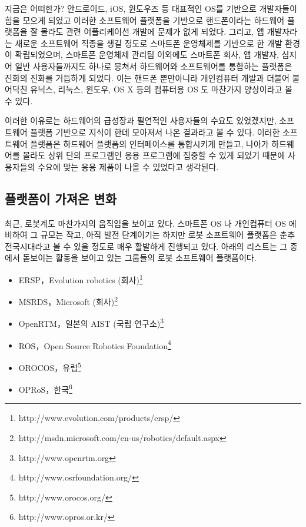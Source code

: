 지금은 어떠한가?
안드로이드, iOS, 윈도우즈 등 대표적인 OS를 기반으로 개발자들이 힘을 모으게 되었고 이러한 소프트웨어 플랫폼을 기반으로 핸드폰이라는 하드웨어 플랫폼을 잘 몰라도 관련 어플리케이션 개발에 문제가 없게 되었다.
그리고, 앱 개발자라는 새로운 소프트웨어 직종을 생길 정도로 스마트폰 운영체제를 기반으로 한 개발 환경이 확립되었으며, 스마트폰 운영체제 관리팀 이외에도 스마트폰 회사, 앱 개발자, 심지어 일반 사용자들까지도 하나로 뭉쳐서 하드웨어와 소프트웨어를 통합하는 플랫폼은 진화의 진화를 거듭하게 되었다.
이는 핸드폰 뿐만아니라 개인컴퓨터 개발과 더불어 불어닥친 유닉스, 리눅스, 윈도우, OS X 등의 컴퓨터용 OS 도 마찬가지 양상이라고 볼 수 있다.

이러한 이유로는 하드웨어의 급성장과 필연적인 사용자들의 수요도 있었겠지만,  소프트웨어 플랫폼 기반으로 지식이 한데 모아져서 나온 결과라고 볼 수 있다.
이러한 소프트웨어 플랫폼은 하드웨어 플랫폼의 인터페이스를 통합시키게 만들고, 나아가 하드웨어를 몰라도 상위 단의 프로그램인 응용 프로그램에 집중할 수 있게 되었기 때문에 사용자들의 수요에 맞는 응용 제품이 나올 수 있었다고 생각된다. 

\subsection{플랫폼이 가져온 변화}

최근, 로봇계도 마찬가지의 움직임을 보이고 있다. 스마트폰 OS 나 개인컴퓨터 OS 에 비하여 그 규모는 작고, 아직 발전 단계이기는 하지만 로봇 소프트웨어 플랫폼은 춘추전국시대라고 볼 수 있을 정도로 매우 활발하게 진행되고 있다.
아래의 리스트는 그 중에서 돋보이는 활동을 보이고 있는 그룹들의 로봇 소프트웨어 플랫폼이다.

\begin{itemize}
\item ERSP，Evolution robotics (회사)\footnote{http://www.evolution.com/products/ersp/}
\item MSRDS，Microsoft (회사)\footnote{http://msdn.microsoft.com/en-us/robotics/default.aspx}
\item OpenRTM，일본의 AIST (국립 연구소)\footnote{http://www.openrtm.org}
\item ROS，Open Source Robotics Foundation\footnote{http://www.osrfoundation.org/}
\item OROCOS，유럽\footnote{http://www.orocos.org/}
\item OPRoS，한국\footnote{http://www.opros.or.kr/}
\end{itemize}

